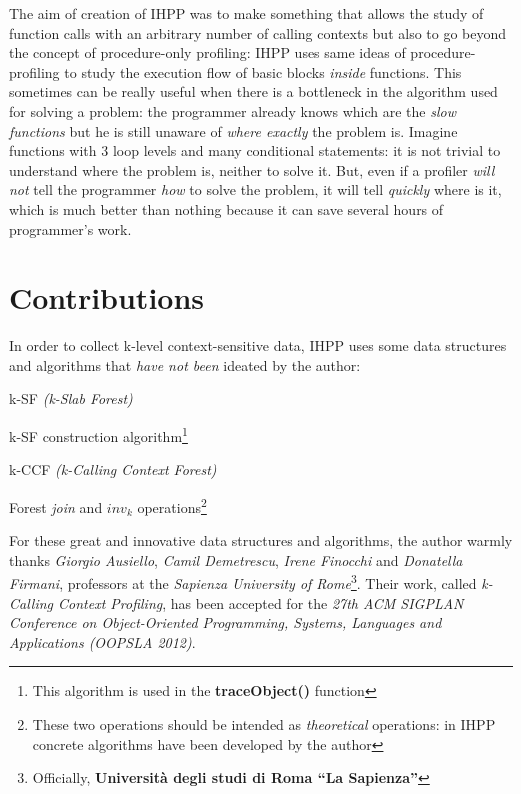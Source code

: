 \documentclass[a4paper,10pt]{report}
\begin{document}
The aim of creation of IHPP was to make something that allows the study of
function calls with an arbitrary number of calling contexts but also to go
beyond the concept of procedure-only profiling: IHPP uses same ideas of
procedure-profiling to study the execution flow of basic blocks \emph{inside}
 functions. This sometimes can be really useful when there is a bottleneck in
the algorithm used for solving a problem: the programmer already knows which are
the \emph{slow functions} but he is still unaware of \emph{where exactly}
the problem is. Imagine functions with 3 loop levels and many conditional
statements: it is not trivial to understand where the problem is, neither to
solve it. But, even if a profiler \emph{will not} tell the programmer \emph{how}
to solve the problem, it will tell \emph{quickly} where is it, which is much
better than nothing because it can save several hours of programmer's work.

\section{Contributions}

In order to collect k-level context-sensitive data, IHPP uses some data
structures and algorithms that \emph{have not been} ideated by the author:

\begin{itemize*}
\item k-SF \emph{(k-Slab Forest)}
\item k-SF construction algorithm\footnote{This algorithm is used in the \textbf{traceObject()} function}
\item k-CCF \emph{(k-Calling Context Forest)}
\item Forest \emph{join} and $inv_k$ operations\footnote{These two operations should
be intended as \emph{theoretical} operations: in IHPP concrete algorithms have been
developed by the author}
\end{itemize*}

For these great and innovative data structures and algorithms, the author warmly
thanks \emph{Giorgio Ausiello}, \emph{Camil Demetrescu}, \emph{Irene Finocchi}
and \emph{Donatella Firmani}, professors at the \emph{Sapienza University of
Rome}\footnote{Officially, \textbf{Universit\`a degli studi di Roma ``La
Sapienza''}}.
Their work, called \emph{\mbox{k-Calling} \mbox{Context} \mbox{Profiling}}, has
been accepted for the \emph{27th \mbox{ACM} \mbox{SIGPLAN} Conference on
Object-Oriented Programming, Systems, Languages and Applications (OOPSLA 2012)}.
\end{document}
